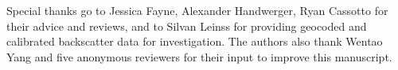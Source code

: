 \documentclass[nhess, manuscript]{copernicus}
\begin{document}















\begin{acknowledgements}
Special thanks go to Jessica Fayne, Alexander Handwerger, Ryan Cassotto for their advice and reviews, and to Silvan Leinss for providing geocoded and calibrated backscatter data for investigation. The authors also thank Wentao Yang and five anonymous reviewers for their input to improve this manuscript. 
\end{acknowledgements}
\end{document}
